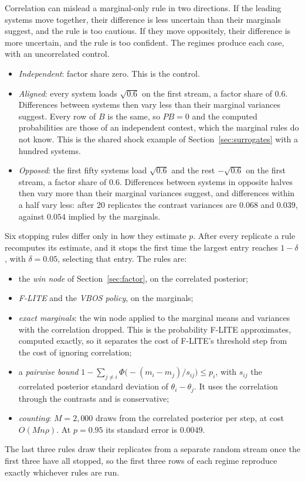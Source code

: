 \documentclass[11pt]{article}
\begin{document}
Correlation can mislead a marginal-only rule in two directions. If
the leading systems move together, their difference is less uncertain
than their marginals suggest, and the rule is too cautious. If they
move oppositely, their difference is more uncertain, and the rule is
too confident. The regimes produce each case, with an uncorrelated
control.

\begin{itemize}
\item \emph{Independent}: factor share zero. This is the control.
\item \emph{Aligned}: every system loads $\sqrt{0.6}$ on the first
stream, a factor share of $0.6$. Differences between systems then vary less than
their marginal variances suggest. Every row of $B$ is the same, so
$PB = 0$ and the computed probabilities are those of an independent
contest, which the marginal rules do not know. This is the shared
shock example of Section~\ref{sec:surrogates} with a hundred systems.
\item \emph{Opposed}: the first fifty systems load $\sqrt{0.6}$ and
the rest $-\sqrt{0.6}$ on the first stream, a factor share of $0.6$. Differences
between systems in opposite halves then vary more than their marginal
variances suggest, and differences within a half vary less: after 20
replicates the contrast variances are $0.068$ and $0.039$, against
$0.054$ implied by the marginals.
\end{itemize}

Six stopping rules differ only in how they estimate $p$. After every
replicate a rule recomputes its estimate, and it stops the first time
the largest entry reaches $1 - \delta$, with $\delta = 0.05$,
selecting that entry. The rules are:
\begin{itemize}
\item the \emph{win node} of Section~\ref{sec:factor}, on the
correlated posterior;
\item \emph{F-LITE} and the \emph{VBOS policy}, on the marginals;
\item \emph{exact marginals}: the win node applied to the marginal
means and variances with the correlation dropped. This is the
probability F-LITE approximates, computed exactly, so it separates the
cost of F-LITE's threshold step from the cost of ignoring
correlation;
\item a \emph{pairwise bound}
$1-\sum_{j\ne i}\Phi\bigl(-(m_i-m_j)/s_{ij}\bigr)\le p_i$, with
$s_{ij}$ the correlated posterior standard deviation of
$\theta_i-\theta_j$. It uses the correlation through the contrasts
and is conservative;
\item \emph{counting}: $M=2{,}000$ draws from the correlated posterior
per step, at cost $O(Mn\rho)$. At $p=0.95$ its standard error is
$0.0049$.
\end{itemize}
The last three rules draw their replicates from a separate random
stream once the first three have all stopped, so the first three rows
of each regime reproduce exactly whichever rules are run.
\end{document}
